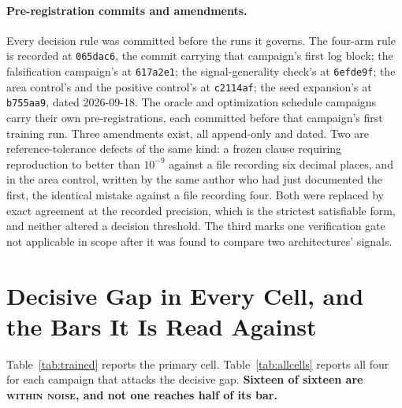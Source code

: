 \documentclass{article}
\begin{document}
\paragraph{Pre-registration commits and amendments.} Every decision rule was committed before the
runs it governs. The four-arm rule is recorded at \texttt{065dac6}, the commit carrying that
campaign's first log block; the falsification campaign's at \texttt{617a2e1}; the signal-generality
check's at \texttt{6efde9f}; the area control's and the positive control's at \texttt{c2114af}; the
seed expansion's at \texttt{b755aa9}, dated 2026-09-18. The oracle and optimization schedule
campaigns carry their own pre-registrations, each committed before that campaign's first training
run. Three amendments exist, all append-only and dated. Two are reference-tolerance defects of the
same kind: a frozen clause requiring reproduction to better than $10^{-9}$ against a file recording
six decimal places, and in the area control, written by the same author who had just documented
the first, the identical mistake against a file recording four. Both were replaced by exact
agreement at the recorded precision, which is the strictest satisfiable form, and neither altered a
decision threshold. The third marks one verification gate not applicable in scope after it was found
to compare two architectures' signals.


\section{Decisive Gap in Every Cell, and the Bars It Is Read Against}
\label{app:diag}

Table~\ref{tab:trained} reports the primary cell. Table~\ref{tab:allcells} reports all four for
each campaign that attacks the decisive gap. \textbf{Sixteen of sixteen are \textsc{within noise},
and not one reaches half of its bar.}
\end{document}
